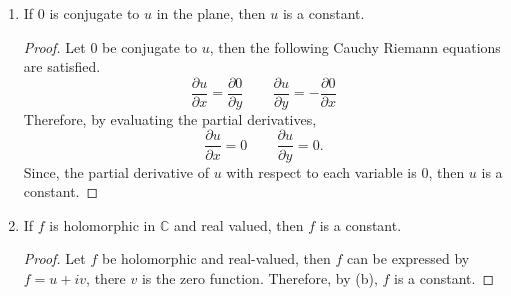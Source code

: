 \documentclass[12pt]{article}
\begin{document}
\begin{enumerate}
\begin{enumerate}
\begin{proof}
And we obtain the following by computing the difference between the right equations,
\begin{align*}
\frac{\partial u}{\partial y}-\frac{\partial u}{\partial y}  &= -\frac{\partial v_1}{\partial x} +\frac{\partial v_2}{\partial x} \\
0 &= -\frac{\partial v_1}{\partial x} +\frac{\partial v_2}{\partial x} \\
\int 0  \partial x &= \int \Big(-\frac{\partial v_1}{\partial x} +\frac{\partial v_2}{\partial x}\Big) \partial x \\
\phi_2(y)&=-v_1+v_2
\end{align*}
Then, we sum the functions obtained from partial integration, therefore, $\phi_1(x)+\phi_2(y)=v_1-v_2-v_1+v_2$, in other words, $\phi_1(x)+\phi_2(y)=0$ or $\phi_1(x)=-\phi_2(y)$. Therefore, there cannot exist non-constant terms in either $\phi_1$ or $\phi_2$. Therefore, $v_1-v_2$ is a constant. 
\end{proof}

\item If 0 is conjugate to $u$ in the plane, then $u$ is a constant.
\begin{proof}
Let 0 be conjugate to $u$, then the following Cauchy Riemann equations are satisfied.
$$\frac{\partial u}{\partial x} = \frac{\partial 0}{\partial y} \hspace{25pt} \frac{\partial u}{\partial y} = -\frac{\partial 0}{\partial x}$$
Therefore, by evaluating the partial derivatives,
$$\frac{\partial u}{\partial x} = 0 \hspace{25pt} \frac{\partial u}{\partial y} = 0.$$
Since, the partial derivative of $u$ with respect to each variable is 0, then $u$ is a constant. 
\end{proof}
\item If $f$ is holomorphic in $\mathbb{C}$ and real valued, then $f$ is a constant. 
\begin{proof}
Let $f$ be holomorphic and real-valued, then $f$ can be expressed by $f=u+iv$, there $v$ is the zero function. Therefore, by (b), $f$ is a constant.
\end{proof}
\end{enumerate}
\end{enumerate}
\end{document}
